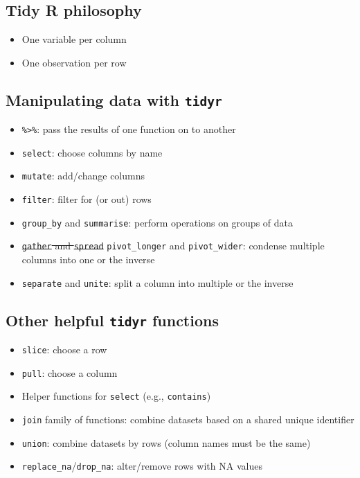 \documentclass[
  openany]{book}
\providecommand{\tightlist}{%
  \setlength{\itemsep}{0pt}\setlength{\parskip}{0pt}}
\begin{document}
\hypertarget{tidy-r-philosophy}{%
\subsection{Tidy R philosophy}\label{tidy-r-philosophy}}

\begin{itemize}
\tightlist
\item
  One variable per column
\item
  One observation per row
\end{itemize}

\hypertarget{manipulating-data-with-tidyr}{%
\subsection{\texorpdfstring{Manipulating data with \texttt{tidyr}}{Manipulating data with tidyr}}\label{manipulating-data-with-tidyr}}

\begin{itemize}
\tightlist
\item
  \texttt{\%\textgreater{}\%}: pass the results of one function on to another
\item
  \texttt{select}: choose columns by name
\item
  \texttt{mutate}: add/change columns
\item
  \texttt{filter}: filter for (or out) rows
\item
  \texttt{group\_by} and \texttt{summarise}: perform operations on groups of data
\item
  \sout{\mbox{\texttt{gather}} and \mbox{\texttt{spread}}} \texttt{pivot\_longer} and \texttt{pivot\_wider}: condense multiple columns into one or the inverse
\item
  \texttt{separate} and \texttt{unite}: split a column into multiple or the inverse
\end{itemize}

\hypertarget{other-helpful-tidyr-functions}{%
\subsection{\texorpdfstring{Other helpful \texttt{tidyr} functions}{Other helpful tidyr functions}}\label{other-helpful-tidyr-functions}}

\begin{itemize}
\tightlist
\item
  \texttt{slice}: choose a row
\item
  \texttt{pull}: choose a column
\item
  Helper functions for \texttt{select} (e.g., \texttt{contains})
\item
  \texttt{join} family of functions: combine datasets based on a shared unique identifier
\item
  \texttt{union}: combine datasets by rows (column names must be the same)
\item
  \texttt{replace\_na}/\texttt{drop\_na}: alter/remove rows with NA values
\end{itemize}
\end{document}
